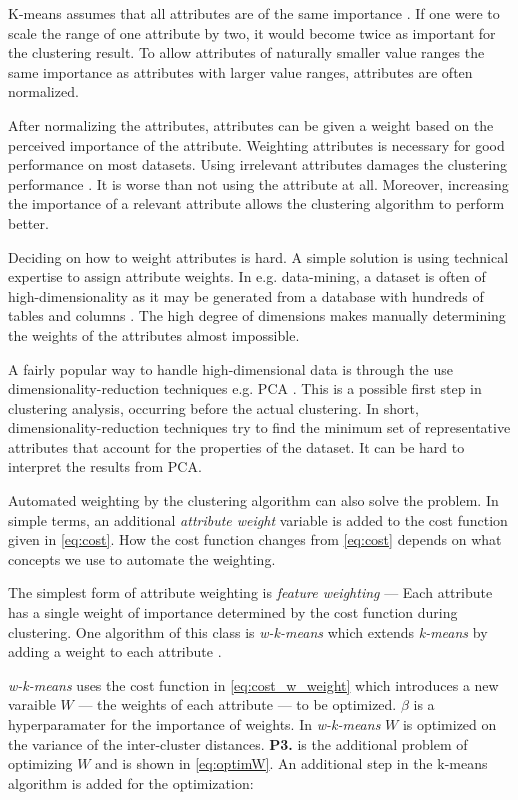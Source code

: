 \documentclass[../report.tex]{subfiles}
\begin{document}
K-means assumes that all attributes are of the same importance \cite{Kaufman1990}. If one were to scale the range of one attribute by two, it would become twice as important for the clustering result. To allow attributes of naturally smaller value ranges the same importance as attributes with larger value ranges, attributes are often normalized. 

After normalizing the attributes, attributes can be given a weight based on the perceived importance of the attribute. Weighting attributes is necessary for good performance on most datasets. Using irrelevant attributes damages the clustering performance \cite{Kaufman1990}. It is worse than not using the attribute at all. Moreover, increasing the importance of a relevant attribute allows the clustering algorithm to perform better. %

Deciding on how to weight attributes is hard. A simple solution is using technical expertise to assign attribute weights. In e.g. data-mining, a dataset is often of high-dimensionality as it may be generated from a database with hundreds of tables and columns \cite{Jing2007}. The high degree of dimensions makes manually determining the weights of the attributes almost impossible.

A fairly popular way to handle high-dimensional data is through the use dimensionality-reduction techniques e.g. PCA \cite{Jolliffe2005,van2009}. This is a possible first step in clustering analysis, occurring before the actual clustering. In short, dimensionality-reduction techniques try to find the minimum set of representative attributes that account for the properties of the dataset. It can be hard to interpret the results from PCA.

Automated weighting by the clustering algorithm can also solve the problem. In simple terms, an additional \textit{attribute weight} variable is added to the cost function given in \ref{eq:cost}. How the cost function changes from \ref{eq:cost} depends on what concepts we use to automate the weighting.

The simplest form of attribute weighting is \textit{feature weighting} --- Each attribute has a single weight of importance determined by the cost function during clustering. One algorithm of this class is \textit{w-k-means} which extends \textit{k-means} by adding a weight to each attribute \cite{huang2005automated}.


\textit{w-k-means} uses the cost function in \ref{eq:cost_w_weight} which introduces a new varaible $W$ --- the weights of each attribute --- to be optimized. $\beta$ is a hyperparamater for the importance of weights. In \textit{w-k-means} $W$ is optimized on the variance of the inter-cluster distances. \textbf{P3.} is the additional problem of optimizing $W$ and is shown in \ref{eq:optimW}. An additional step in the k-means algorithm is added for the optimization:
\end{document}
